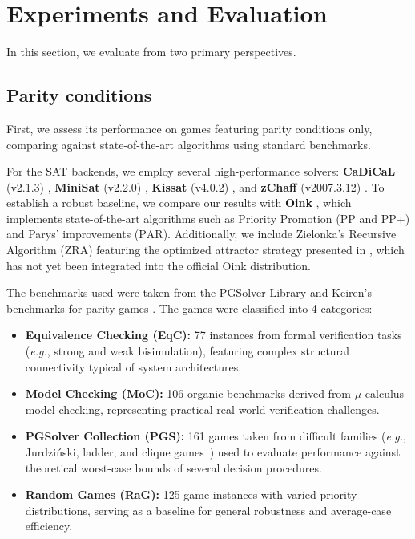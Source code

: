 \documentclass[a4paper,UKenglish,cleveref, autoref, thm-restate, anonymous]{lipics-v2021}
\begin{document}

\section{Experiments and Evaluation}\label{sec:experiments}

In this section, we evaluate \nocq from two primary perspectives.

\subsection{Parity conditions}

First, we assess its performance on games featuring parity conditions only, comparing \nocq against state-of-the-art algorithms using standard benchmarks.

For the SAT backends, we employ several high-performance solvers: \textbf{CaDiCaL} (v2.1.3) \cite{Biere:Cadical:2024}, \textbf{MiniSat} (v2.2.0) \cite{Een:MiniSat:2003}, \textbf{Kissat} (v4.0.2) \cite{Biere:Kissat:2024}, and \textbf{zChaff} (v2007.3.12) \cite{Moskewicz:zChaff:2001}. To establish a robust baseline, we compare our results with \textbf{Oink} \cite{vanDijk:2018}, which implements state-of-the-art algorithms such as Priority Promotion ($\text{PP}$ and $\text{PP+}$) and Parys' improvements ($\text{PAR}$). Additionally, we include Zielonka's Recursive Algorithm ($\text{ZRA}$) featuring the optimized attractor strategy presented in \cite{Aggarwal:2023}, which has not yet been integrated into the official Oink distribution.

The benchmarks used were taken from the PGSolver Library \cite{Friedmann:2017} and Keiren's benchmarks for parity games \cite{Keiren:2015}. The games were classified into 4 categories:

\begin{itemize}
\item \textbf{Equivalence Checking (EqC):} 77 instances from formal verification tasks ({\em e.g.}, strong and weak bisimulation), featuring complex structural connectivity typical of system architectures.
\item \textbf{Model Checking (MoC):} 106 organic benchmarks derived from $\mu$-calculus model checking, representing practical real-world verification challenges.
\item \textbf{PGSolver Collection (PGS):} 161 games taken from difficult families ({\em e.g.}, Jurdziński, ladder, and clique games~\cite{Benerecetti:2016}) used to evaluate performance against theoretical worst-case bounds of several decision procedures.
\item \textbf{Random Games (RaG):} 125 game instances with varied priority distributions, serving as a baseline for general robustness and average-case efficiency.
\end{itemize}
\end{document}
